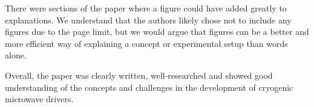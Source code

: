 \documentclass[11pt]{article}
\begin{document}
There were sections of the paper where a figure could have
added greatly to explanations. We understand that the authors likely
chose not to include any figures due to the page limit, but we would
argue that figures can be a better and more efficient way of
explaining a concept or experimental setup than words alone.

Overall, the paper was clearly written, well-researched and showed
good understanding of the concepts and challenges in the development
of cryogenic microwave drivers.
\end{document}
